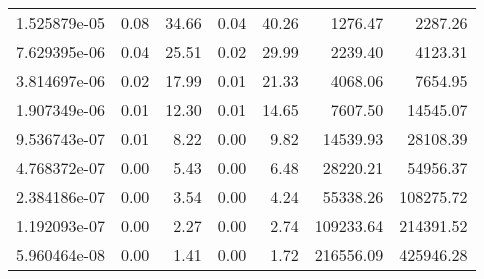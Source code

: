\begin{tabular}{lrrrrrr}
1.525879e-05 &        0.08 &         34.66 &           0.04 &        40.26 &          1276.47 &         2287.26 \\
7.629395e-06 &        0.04 &         25.51 &           0.02 &        29.99 &          2239.40 &         4123.31 \\
3.814697e-06 &        0.02 &         17.99 &           0.01 &        21.33 &          4068.06 &         7654.95 \\
1.907349e-06 &        0.01 &         12.30 &           0.01 &        14.65 &          7607.50 &        14545.07 \\
9.536743e-07 &        0.01 &          8.22 &           0.00 &         9.82 &         14539.93 &        28108.39 \\
4.768372e-07 &        0.00 &          5.43 &           0.00 &         6.48 &         28220.21 &        54956.37 \\
2.384186e-07 &        0.00 &          3.54 &           0.00 &         4.24 &         55338.26 &       108275.72 \\
1.192093e-07 &        0.00 &          2.27 &           0.00 &         2.74 &        109233.64 &       214391.52 \\
5.960464e-08 &        0.00 &          1.41 &           0.00 &         1.72 &        216556.09 &       425946.28 \\
\bottomrule
\end{tabular}
